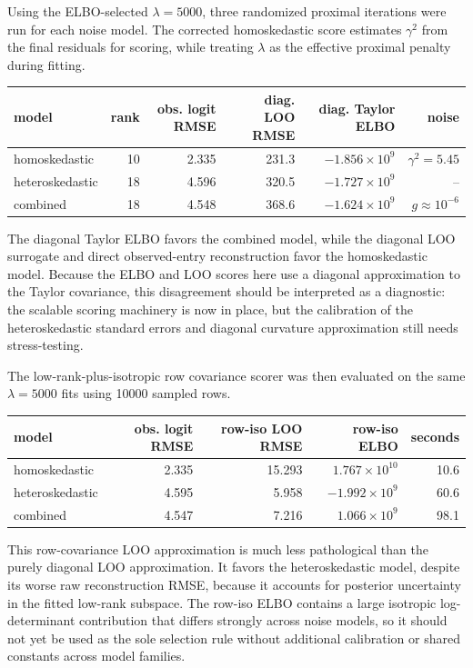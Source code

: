\documentclass[11pt]{article}
\begin{document}
Using the ELBO-selected \(\lambda=5000\), three randomized proximal iterations
were run for each noise model.  The corrected homoskedastic score estimates
\(\gamma^2\) from the final residuals for scoring, while treating \(\lambda\) as
the effective proximal penalty during fitting.

\begin{center}
\begin{tabular}{lrrrrr}
\toprule
model & rank & obs. logit RMSE & diag. LOO RMSE & diag. Taylor ELBO & noise\\
\midrule
homoskedastic & 10 & 2.335 & 231.3 & \(-1.856\times 10^9\) & \(\gamma^2=5.45\)\\
heteroskedastic & 18 & 4.596 & 320.5 & \(-1.727\times 10^9\) & --\\
combined & 18 & 4.548 & 368.6 & \(-1.624\times 10^9\) & \(g\approx 10^{-6}\)\\
\bottomrule
\end{tabular}
\end{center}

The diagonal Taylor ELBO favors the combined model, while the diagonal LOO
surrogate and direct observed-entry reconstruction favor the homoskedastic
model.  Because the ELBO and LOO scores here use a diagonal approximation to the
Taylor covariance, this disagreement should be interpreted as a diagnostic:
the scalable scoring machinery is now in place, but the calibration of the
heteroskedastic standard errors and diagonal curvature approximation still needs
stress-testing.

The low-rank-plus-isotropic row covariance scorer was then evaluated on the same
\(\lambda=5000\) fits using 10000 sampled rows.

\begin{center}
\begin{tabular}{lrrrr}
\toprule
model & obs. logit RMSE & row-iso LOO RMSE & row-iso ELBO & seconds\\
\midrule
homoskedastic & 2.335 & 15.293 & \(1.767\times 10^{10}\) & 10.6\\
heteroskedastic & 4.595 & 5.958 & \(-1.992\times 10^9\) & 60.6\\
combined & 4.547 & 7.216 & \(1.066\times 10^9\) & 98.1\\
\bottomrule
\end{tabular}
\end{center}

This row-covariance LOO approximation is much less pathological than the purely
diagonal LOO approximation.  It favors the heteroskedastic model, despite its
worse raw reconstruction RMSE, because it accounts for posterior uncertainty in
the fitted low-rank subspace.  The row-iso ELBO contains a large isotropic
log-determinant contribution that differs strongly across noise models, so it
should not yet be used as the sole selection rule without additional calibration
or shared constants across model families.
\end{document}
